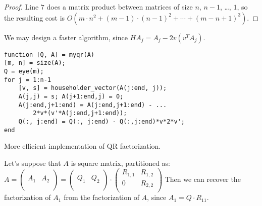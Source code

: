 \documentclass[computational_mathematics.tex]{subfiles}
\begin{document}
\begin{proof}
  Line $7$ does a matrix product between matrices of size $n$, $n-1$, \ldots, $1$, so the resulting cost is  $O(m \cdot n^{2} + {(m-1) \cdot (n-1)}^{2} + \cdots + {(m - n + 1)}^{3})$.

\end{proof}

We may design a faster algorithm, since $HA_j = A_j - 2v(v^T A_j)$.
\begin{center}
\begin{minipage}{.9\linewidth}
\begin{algorithm}[H]
\begin{verbatim}
function [Q, A] = myqr(A)
[m, n] = size(A);
Q = eye(m);
for j = 1:n-1
    [v, s] = householder_vector(A(j:end, j));
    A(j,j) = s; A(j+1:end,j) = 0;
    A(j:end,j+1:end) = A(j:end,j+1:end) - ...
        2*v*(v'*A(j:end,j+1:end));
    Q(:, j:end) = Q(:, j:end) - Q(:,j:end)*v*2*v';
end
\end{verbatim}
  \label{alg:26ottQR2}
\caption{More efficient implementation of QR factorization.}
\end{algorithm}
\end{minipage}
\end{center}

Let's suppose that $A$ is square matrix, partitioned as: 
$A = \begin{pmatrix}
  &\\
  A_{1} & A_{2}\\
  &\\
\end{pmatrix} =
 \begin{pmatrix}
   &\\
   Q_{1} & Q_{2}\\
   &\\
\end{pmatrix} \cdot
\begin{pmatrix}
  R_{1, 1} & R_{1,2}\\
  0 & R_{2,2}\\
\end{pmatrix}$
Then we can recover the factorization of $A_{1}$ from the factorization of $A$, since $A_{1} = Q \cdot R_{11}$.
\end{document}
